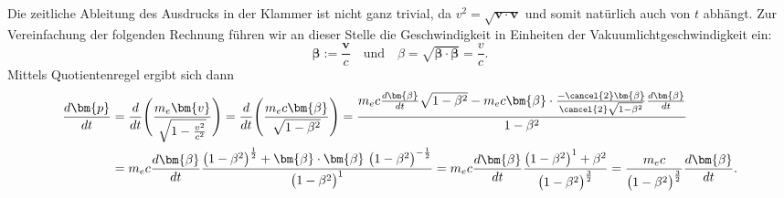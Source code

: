 Die zeitliche Ableitung des Ausdrucks in der Klammer ist nicht ganz trivial,
da \(v^2=\sqrt{\bm{v}\cdot\bm{v}}\)
und somit natürlich auch von \(t\) abhängt.
Zur Vereinfachung der folgenden Rechnung führen wir an dieser Stelle
die Geschwindigkeit in Einheiten der Vakuumlichtgeschwindigkeit ein:
\begin{equation*}
    \bm{\beta} := \frac{\bm{v}}{c} \quad \text{und} \quad
    \beta = \sqrt{\bm{\beta}\cdot\bm{\beta}} = \frac{v}{c}.
\end{equation*}
Mittels Quotientenregel ergibt sich dann
\begin{align*}
    \frac{d\bm{p}}{dt}
    &= \frac{d}{dt} \Biggl(\frac{m_e \bm{v}}{\sqrt{1-\frac{v^2}{c^2}}}\Biggr)
    = \frac{d}{dt} \Biggl(\frac{m_e c \bm{\beta}}{\sqrt{1-\beta^2}}\Biggr)
    = \frac{m_ec\frac{d\bm{\beta}}{dt}\sqrt{1-\beta^2}
    -m_ec\bm{\beta}\cdot\frac{-\cancel{2}\bm{\beta}}{\cancel{2}\sqrt{1-\beta^2}}
    \frac{d\bm{\beta}}{dt}}{1-\beta^2}\\
    &= m_ec\frac{d\bm{\beta}}{dt}\frac{\bigl(1-\beta^2\bigr)^\frac{1}{2}
    +\bm{\beta}\cdot\bm{\beta} \ \bigl(1-\beta^2\bigr)^{-\frac{1}{2}}}
    {\bigl(1-\beta^2\bigr)^1}
    = m_ec\frac{d\bm{\beta}}{dt}\frac{\bigl(1-\beta^2\bigr)^1
    +\beta^2}{\bigl(1-\beta^2\bigr)^\frac{3}{2}}
    = \frac{m_ec}{\bigl(1-\beta^2\bigr)^\frac{3}{2}}\frac{d\bm{\beta}}{dt}.
\end{align*}

